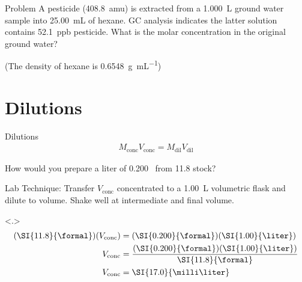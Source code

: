 \documentclass[notes=hide]{beamer}
\begin{document}
\begin{frame}[t]{Problem}
	A pesticide (\SI{408.8}{amu}) is extracted from a \SI{1.000}{\liter}
	ground water sample into \SI{25.00}{\milli\liter} of hexane. GC
	analysis indicates the latter solution contains \SI{52.1}{ppb}
	pesticide. What is the molar concentration in the original ground
	water?

	\pause

	\begin{center}
		(The density of hexane is \SI{0.6548}{\gram\per\milli\liter})
	\end{center}


\end{frame}

\section{Dilutions}

\begin{frame}[t]{Dilutions}
	\begin{align*}
		M_\text{conc} V_\text{conc} = M_\text{dil} V_\text{dil}
	\end{align*}

	How would you prepare a liter of \SI{0.200}{\formal}~ from
	\SI{11.8}{\formal} stock?

	\pause


	\begin{block}{Lab Technique:}
		Transfer $V_\text{conc}$ concentrated  to a
		\SI{1.00}{\liter} volumetric flask and dilute to volume. Shake
		well at intermediate and final volume.
	\end{block}

	{
	\begin{align*}
		(\SI{11.8}{\formal})(V_\text{conc}) &=
		(\SI{0.200}{\formal})(\SI{1.00}{\liter}) \\
		V_\text{conc} &=
		\dfrac{(\SI{0.200}{\formal})(\SI{1.00}{\liter})}{\SI{11.8}{\formal}} \\
		V_\text{conc} &= \SI{17.0}{\milli\liter}
	\end{align*}
	}
\end{frame}
\end{document}
